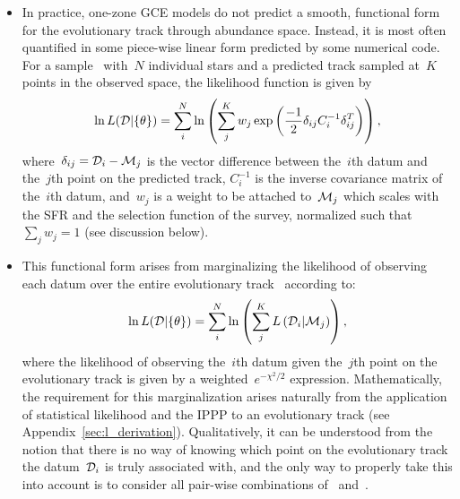 \documentclass[ms.tex]{subfiles}
\begin{document}
\begin{itemize}
	\item In practice, one-zone GCE models do not predict a smooth, functional
	form for the evolutionary track through abundance space.
	Instead, it is most often quantified in some piece-wise linear form
	predicted by some numerical code.
	For a sample~ with~$N$ individual stars and a predicted track
	 sampled at~$K$ points in the observed space, the likelihood
	function is given by
	\begin{equation}
	\ln L(\mathcal{D} | \{\theta\}) = \sum_i^N \ln \left(
	\sum_j^K w_j \exp \left(
	\frac{-1}{2} \delta_{ij} C_i^{-1} \delta_{ij}^T
	\right)
	\right),
	\label{eq:likelihood}
	\end{equation}
	where~$\delta_{ij} = \mathcal{D}_i - \mathcal{M}_j$ is the vector difference
	between the~$i$th datum and the~$j$th point on the predicted track,
	$C_i^{-1}$ is the inverse covariance matrix of the~$i$th datum, and~$w_j$
	is a weight to be attached to~$\mathcal{M}_j$ which scales with the
	SFR and the selection function of the survey, normalized such that
	$\sum_j w_j = 1$ (see discussion below).

	\item This functional form arises from marginalizing the likelihood of
	observing each datum over the entire evolutionary track~
	according to:
	\begin{equation}
	\ln L(\mathcal{D} | \{\theta\}) = \sum_i^N \ln \left(
	\sum_j^K L\left(\mathcal{D}_i | \mathcal{M}_j
	\right)\right),
	\end{equation}
	where the likelihood of observing the~$i$th datum given the~$j$th point on
	the evolutionary track is given by a weighted~$e^{-\chi^2/2}$
	expression.
	Mathematically, the requirement for this marginalization arises naturally
	from the application of statistical likelihood and the IPPP to an
	evolutionary track (see Appendix~\ref{sec:l_derivation}).
	Qualitatively, it can be understood from the notion that there is no way
	of knowing which point on the evolutionary track the datum~$\mathcal{D}_i$
	is truly associated with, and the only way to properly take this into
	account is to consider all pair-wise combinations of~
	and~.


\end{itemize}
\end{document}
